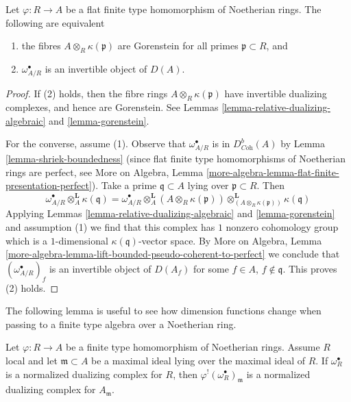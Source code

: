 \begin{lemma}
\label{lemma-gorenstein-shriek}
Let $\varphi : R \to A$ be a flat finite type homomorphism of Noetherian rings.
The following are equivalent
\begin{enumerate}
\item the fibres $A \otimes_R \kappa(\mathfrak p)$ are Gorenstein
for all primes $\mathfrak p \subset R$, and
\item $\omega_{A/R}^\bullet$ is an invertible object of $D(A)$.
\end{enumerate}
\end{lemma}

\begin{proof}
If (2) holds, then the fibre rings $A \otimes_R \kappa(\mathfrak p)$
have invertible dualizing complexes, and hence are Gorenstein.
See Lemmas \ref{lemma-relative-dualizing-algebraic} and \ref{lemma-gorenstein}.

\medskip\noindent
For the converse, assume (1).
Observe that $\omega_{A/R}^\bullet$ is in $D^b_{\textit{Coh}}(A)$
by Lemma \ref{lemma-shriek-boundedness} (since flat finite type homomorphisms
of Noetherian rings are perfect, see 
More on Algebra, Lemma
\ref{more-algebra-lemma-flat-finite-presentation-perfect}).
Take a prime $\mathfrak q \subset A$ lying over $\mathfrak p \subset R$.
Then
$$
\omega_{A/R}^\bullet \otimes_A^\mathbf{L} \kappa(\mathfrak q) =
\omega_{A/R}^\bullet \otimes_A^\mathbf{L}
(A \otimes_R \kappa(\mathfrak p))
\otimes_{(A \otimes_R \kappa(\mathfrak p))}^\mathbf{L}
\kappa(\mathfrak q)
$$
Applying Lemmas \ref{lemma-relative-dualizing-algebraic} and
\ref{lemma-gorenstein} and assumption (1) we find that this complex has $1$
nonzero cohomology group which is a $1$-dimensional
$\kappa(\mathfrak q)$-vector space. By
More on Algebra, Lemma
\ref{more-algebra-lemma-lift-bounded-pseudo-coherent-to-perfect}
we conclude that $(\omega_{A/R}^\bullet)_f$ is an invertible
object of $D(A_f)$ for some $f \in A$, $f \not \in \mathfrak q$.
This proves (2) holds.
\end{proof}

\noindent
The following lemma is useful to see how dimension functions change
when passing to a finite type algebra over a Noetherian ring.

\begin{lemma}
\label{lemma-shriek-normalized}
Let $\varphi : R \to A$ be a finite type homomorphism of Noetherian rings.
Assume $R$ local and let $\mathfrak m \subset A$ be a maximal
ideal lying over the maximal ideal of $R$. If $\omega_R^\bullet$
is a normalized dualizing complex for $R$, then
$\varphi^!(\omega_R^\bullet)_\mathfrak m$ is a normalized
dualizing complex for $A_\mathfrak m$.
\end{lemma}

